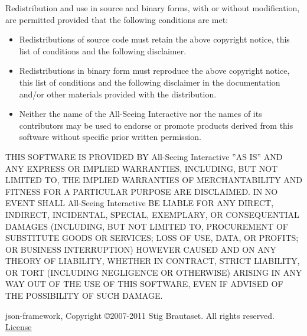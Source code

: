 \documentclass[oneside, openany, 12pt]{tufte-book}
\newcommand{\licensetext}{\scriptsize \setlength{\parskip}{0mm} \singlespacing}
\begin{document}
{\licensetext Redistribution and use in source and binary forms, with or without
modification, are permitted provided that the following conditions are met:

\begin{itemize}

\item Redistributions of source code must retain the above copyright
notice, this list of conditions and the following disclaimer.
       
       
\item Redistributions in binary form must reproduce the above copyright
notice, this list of conditions and the following disclaimer in the
documentation and/or other materials provided with the distribution.

\item Neither the name of the All-Seeing Interactive nor the
names of its contributors may be used to endorse or promote products
derived from this software without specific prior written permission.
\end{itemize}
THIS SOFTWARE IS PROVIDED BY All-Seeing Interactive ''AS IS'' AND ANY
EXPRESS OR IMPLIED WARRANTIES, INCLUDING, BUT NOT LIMITED TO, THE IMPLIED
WARRANTIES OF MERCHANTABILITY AND FITNESS FOR A PARTICULAR PURPOSE ARE
DISCLAIMED. IN NO EVENT SHALL All-Seeing Interactive BE LIABLE FOR ANY
DIRECT, INDIRECT, INCIDENTAL, SPECIAL, EXEMPLARY, OR CONSEQUENTIAL DAMAGES
(INCLUDING, BUT NOT LIMITED TO, PROCUREMENT OF SUBSTITUTE GOODS OR SERVICES;
LOSS OF USE, DATA, OR PROFITS; OR BUSINESS INTERRUPTION) HOWEVER CAUSED AND
ON ANY THEORY OF LIABILITY, WHETHER IN CONTRACT, STRICT LIABILITY, OR TORT
(INCLUDING NEGLIGENCE OR OTHERWISE) ARISING IN ANY WAY OUT OF THE USE OF THIS
SOFTWARE, EVEN IF ADVISED OF THE POSSIBILITY OF SUCH DAMAGE.}

json-framework, Copyright \copyright 2007-2011 Stig Brautaset. All rights reserved. \href{https://raw.github.com/stig/json-framework/master/LICENSE.md}{License}
\end{document}

